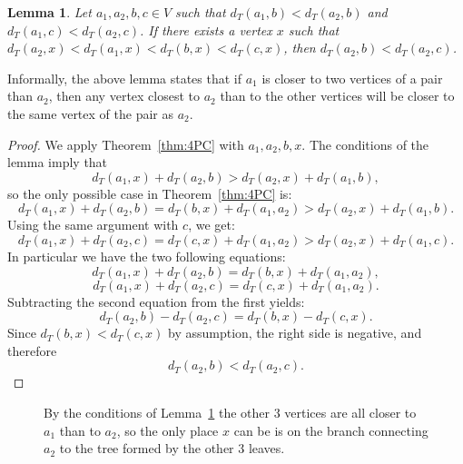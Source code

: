 \documentclass[11pt, letter]{article}
\newtheorem{lemma}[theorem]{Lemma}
\theoremstyle{remark}
\begin{document}
\begin{lemma}\label{lem:twins}
    Let $a_1,a_2,b,c \in V$ such that $d_T(a_1,b)< d_T(a_2,b)$ and $d_T(a_1,c)< d_T(a_2,c)$. If there exists a vertex $x$ such that $d_T(a_2,x)<d_T(a_1,x)<d_T(b,x)<d_T(c,x)$, then $d_T(a_2,b) < d_T(a_2,c)$.
\end{lemma}

Informally, the above lemma states that if $a_1$ is closer to two vertices of a pair than $a_2$, then any vertex closest to $a_2$ than to the other vertices will be closer to the same vertex of the pair as $a_2$.

\begin{proof}
  We apply Theorem~\ref{thm:4PC} with $a_1, a_2, b, x$. The conditions of the lemma imply that
$$
d_T(a_1, x) + d_T(a_2, b) > d_T(a_2, x) + d_T(a_1, b),
$$
so the only possible case in Theorem~\ref{thm:4PC} is:
$$
d_T(a_1, x) + d_T(a_2, b) = d_T(b, x) + d_T(a_1, a_2) > d_T(a_2, x) + d_T(a_1, b).
$$
Using the same argument with $c$, we get:
$$
d_T(a_1, x) + d_T(a_2, c) = d_T(c, x) + d_T(a_1, a_2) > d_T(a_2, x) + d_T(a_1, c).
$$
In particular we have the two following equations:
$$
d_T(a_1, x) + d_T(a_2, b) = d_T(b, x) + d_T(a_1, a_2),
$$
$$
d_T(a_1, x) + d_T(a_2, c) = d_T(c, x) + d_T(a_1, a_2).
$$
Subtracting the second equation from the first yields:
$$
d_T(a_2, b) - d_T(a_2, c) = d_T(b, x) - d_T(c, x).
$$
Since $d_T(b, x) < d_T(c, x)$ by assumption, the right side is negative, and therefore
$$
d_T(a_2, b) < d_T(a_2, c).
$$

\end{proof}
\begin{figure}
    \centering
    \caption{By the conditions of Lemma~\ref{lem:twins} the other 3 vertices are all closer to $a_1$ than to $a_2$, so the only place $x$ can be is on the branch connecting $a_2$ to the tree formed by the other 3 leaves.}
\end{figure}
\end{document}
